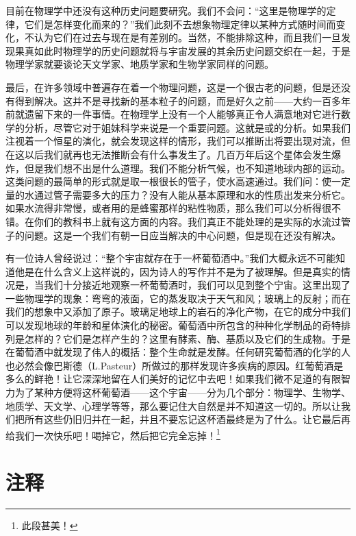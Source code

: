 \documentclass[11pt,oneside]{book}
\begin{document}
\begin{common-format}
目前在物理学中还没有这种历史问题要研究。我们不会问：“这里是物理学的定律，它们是怎样变化而来的？”我们此刻不去想象物理定律以某种方式随时间而变化，不认为它们在过去与现在是有差别的。当然，不能排除这种，而且我们一旦发现果真如此时物理学的历史问题就将与宇宙发展的其余历史问题交织在一起，于是物理学家就要谈论天文学家、地质学家和生物学家同样的问题。

最后，在许多领域中普遍存在着一个物理问题，这是一个很古老的问题，但是还没有得到解决。这并不是寻找新的基本粒子的问题，而是好久之前——大约一百多年前就遗留下来的一件事情。在物理学上没有一个人能够真正令人满意地对它进行数学的分析，尽管它对于姐妹科学来说是一个重要问题。这就是或的分析。如果我们注视着一个恒星的演化，就会发现这样的情形，我们可以推断出将要出现对流，但在这以后我们就再也无法推断会有什么事发生了。几百万年后这个星体会发生爆炸，但是我们想不出是什么道理。我们不能分析气候，也不知道地球内部的运动。这类问题的最简单的形式就是取一根很长的管子，使水高速通过。我们问：使一定量的水通过管子需要多大的压力？没有人能从基本原理和水的性质出发来分析它。如果水流得非常慢，或者用的是蜂蜜那样的粘性物质，那么我们可以分析得很不错。在你们的教科书上就有这方面的内容。我们真正不能处理的是实际的水流过管子的问题。这是一个我们有朝一日应当解决的中心问题，但是现在还没有解决。

有一位诗人曾经说过：“整个宇宙就存在于一杯葡萄酒中。”我们大概永远不可能知道他是在什么含义上这样说的，因为诗人的写作并不是为了被理解。但是真实的情况是，当我们十分接近地观察一杯葡萄酒时，我们可以见到整个宁宙。这里出现了一些物理学的现象：弯弯的液面，它的蒸发取决于天气和风；玻璃上的反射；而在我们的想象中又添加了原子。玻璃足地球上的岩石的净化产物，在它的成分中我们可以发现地球的年龄和星体演化的秘密。葡萄酒中所包含的种种化学制品的奇特排列是怎样的？它们是怎样产生的？这里有酵素、酶、基质以及它们的生成物。于是在葡萄酒中就发现了伟人的概括：整个生命就是发酵。任何研究葡萄酒的化学的人也必然会像巴斯德（L.Pasteur）所做过的那样发现许多疾病的原因。红葡萄酒是多么的鲜艳！让它深深地留在人们美好的记忆中去吧！如果我们微不足道的有限智力为了某种方便将这杯葡萄酒——这个宇宙——分为几个部分：物理学、生物学、地质学、天文学、心理学等等，那么要记住大自然是并不知道这一切的。所以让我们把所有这些仍旧归并在一起，并且不要忘记这杯酒最终是为了什么。让它最后再给我们一次快乐吧！喝掉它，然后把它完全忘掉！\footnote{此段甚美！}

\section{注释}
\showendnotes




\end{common-format}
\end{document}
